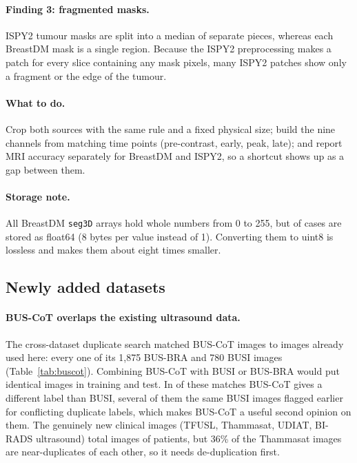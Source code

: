 \documentclass[11pt]{article}
\begin{document}
\paragraph{Finding 3: fragmented masks.}
ISPY2 tumour masks are split into a median of \ispyComponents{} separate
pieces, whereas each BreastDM mask is a single region. Because the ISPY2
preprocessing makes a patch for every slice containing any mask pixels, many
ISPY2 patches show only a fragment or the edge of the tumour.

\paragraph{What to do.} Crop both sources with the same rule and a fixed
physical size; build the nine channels from matching time points
(pre-contrast, early, peak, late); and report MRI accuracy separately for
BreastDM and ISPY2, so a shortcut shows up as a gap between them.

\paragraph{Storage note.} All BreastDM \texttt{seg3D} arrays hold whole
numbers from 0 to 255, but \breadmFloatCases{} of \breadmCases{} cases are
stored as float64 (8 bytes per value instead of 1). Converting them to uint8
is lossless and makes them about eight times smaller.

\subsection{Newly added datasets}
\label{sec:new}

\paragraph{BUS-CoT overlaps the existing ultrasound data.} The cross-dataset
duplicate search matched \buscotOverlap{} BUS-CoT images to images already used
here: every one of its 1,875 BUS-BRA and 780 BUSI images
(Table~\ref{tab:buscot}). Combining BUS-CoT with BUSI or BUS-BRA would put
identical images in training and test. In \buscotRelabelled{} of these
matches BUS-CoT gives a different label than BUSI, several of them the same
BUSI images flagged earlier for conflicting duplicate labels, which makes
BUS-CoT a useful second opinion on them. The genuinely new clinical images
(TFUSL, Thammasat, UDIAT, BI-RADS ultrasound) total \buscotUsable{} images of
\buscotUsablePatients{} patients, but 36\% of the Thammasat images are
near-duplicates of each other, so it needs de-duplication first.
\end{document}
